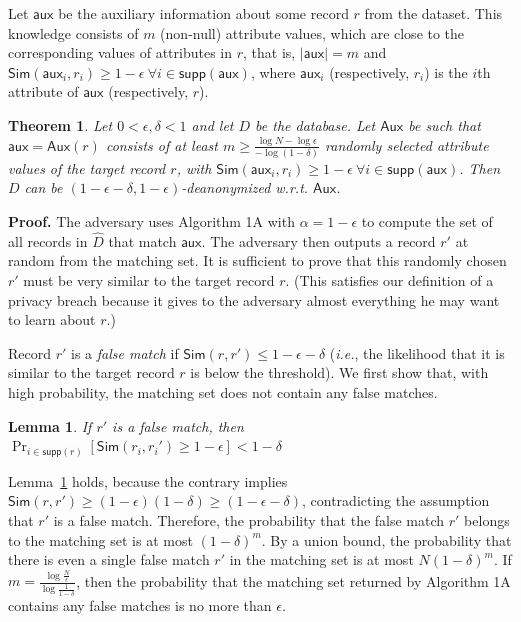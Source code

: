 \documentclass[11pt]{article}
\newcommand{\ie}{\emph{i.e.}}
\newcommand{\Sim}{\textsf{Sim}}
\newcommand{\Aux}{\textsf{Aux}}
\newcommand{\aux}{\textsf{aux}}
\newcommand{\supp}{\textsf{supp}}
\newtheorem{theorem}{Theorem}
\newtheorem{lemma}{Lemma}
\begin{document}
Let $\aux$ be the auxiliary information about some record $r$ from the
dataset.  This knowledge consists of $m$ (non-null) attribute values,
which are close to the corresponding values of attributes in $r$,
that is, $|\aux|=m$ and $\Sim(\aux_i, r_i) \geq 1-\epsilon\ \forall
i \in \supp(\aux)$, where $\aux_i$ (respectively, $r_i$) is the $i$th
attribute of $\aux$ (respectively, $r$).

\begin{theorem}\label{thmstrong}
Let $0 < \epsilon, \delta < 1$ and let $D$ be the database.  Let $\Aux$ be such
that
$\aux = \Aux(r)$ consists of at least $m \geq \frac{\log N-\log \epsilon}{-\log (1-\delta)}$ 
randomly selected attribute values of the target record $r$, with
$\Sim(\aux_i, r_i) \geq 1-\epsilon\ \forall i \in \supp(\aux)$.
Then $D$ can be
$(1-\epsilon-\delta,1-\epsilon)$-deanonymized w.r.t. $\Aux$.
\end{theorem}

{\bf Proof.} The adversary uses Algorithm 1A  with $\alpha=1-\epsilon$
to compute the set of all records in ${\hat D}$ that match $\aux$.
The adversary then outputs a record $r'$ at random from the matching set.
It is sufficient to prove that this randomly chosen $r'$ must be very
similar to the target record $r$. (This satisfies our definition of a
privacy breach because it gives to the adversary almost everything
he may want to learn about $r$.)

Record $r'$ is a \emph{false match} if $\Sim(r, r') \leq 1 - \epsilon -
\delta$ (\ie, the likelihood that it is similar to the target record $r$
is below the threshold).  We first show that, with high probability,
the matching set does not contain any false matches.

\begin{lemma}
\label{falsematchlemma}
If $r'$ is a false match, then $\Pr_{i \in \supp(r)}[\Sim(r_i, r_i')
\geq 1-\epsilon] < 1-\delta$
\end{lemma}

Lemma~\ref{falsematchlemma} holds, because the contrary implies
$\Sim(r,r') \geq (1-\epsilon)(1-\delta) \geq (1-\epsilon-\delta)$,
contradicting the assumption that $r'$ is a false match.  Therefore, the
probability that the false match $r'$ belongs to the matching set is at
most $(1-\delta)^m$.  By a union bound, the probability that there is even
a single false match $r'$ in the matching set is at most $N(1-\delta)^m$.
If $m = \frac{\log \frac{N}{\epsilon}}{\log \frac{1}{1-\delta}}$, then
the probability that the matching set returned by Algorithm 1A
contains any false matches is no more than $\epsilon$.
\end{document}
